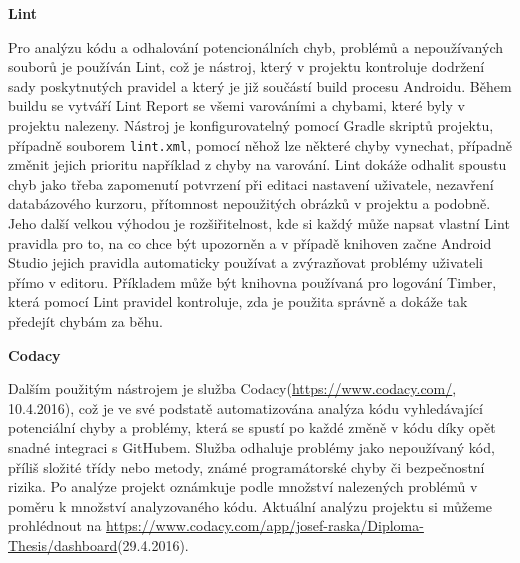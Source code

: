 \documentclass[czech,master,public,dept460,male,java,cpdeclaration]{diploma}
\begin{document}
\noindent
 \textbf{Lint}


 Pro analýzu kódu a odhalování potencionálních chyb, problémů a nepoužívaných souborů je používán Lint,
  což je nástroj, který v projektu kontroluje dodržení sady poskytnutých pravidel a který
  je již součástí build procesu Androidu. Během buildu se vytváří Lint Report
  se všemi varováními a chybami, které byly v projektu nalezeny. Nástroj je konfigurovatelný pomocí
  Gradle skriptů projektu, případně souborem \texttt{lint.xml}, pomocí něhož lze některé chyby
  vynechat, případně změnit jejich prioritu například z chyby na varování.
  Lint dokáže odhalit spoustu chyb jako třeba zapomenutí potvrzení při editaci nastavení uživatele,
  nezavření databázového kurzoru, přítomnost nepoužitých obrázků v projektu a podobně.
  Jeho další velkou výhodou je rozšiřitelnost, kde si každý může napsat vlastní Lint pravidla pro to, na co chce být upozorněn
  a v případě knihoven začne Android Studio jejich pravidla automaticky používat a zvýrazňovat problémy uživateli
  přímo v editoru.
  Příkladem může být knihovna používaná pro logování Timber, která pomocí Lint pravidel
  kontroluje, zda je použita správně a dokáže tak předejít chybám za běhu.

\noindent
\textbf{Codacy}
\nopagebreak

Dalším použitým nástrojem je služba Codacy(\url{https://www.codacy.com/}, 10.4.2016), což je ve své podstatě
automatizována analýza kódu vyhledávající potenciální chyby a problémy, která se spustí po každé změně v kódu
díky opět snadné integraci s GitHubem. Služba odhaluje problémy jako nepoužívaný kód, příliš složité
třídy nebo metody, známé programátorské chyby či bezpečnostní rizika. Po analýze projekt oznámkuje podle
množství nalezených problémů v poměru k množství analyzovaného kódu. Aktuální analýzu projektu si můžeme prohlédnout
na \url{https://www.codacy.com/app/josef-raska/Diploma-Thesis/dashboard}(29.4.2016).
\end{document}
